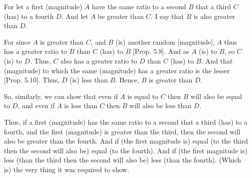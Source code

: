 \begin{Parallel}{}{}
{\epsfysize=0.5in
\centerline{}

For let a first (magnitude) $A$ have the same ratio to a second $B$  that a
third $C$ (has) to a fourth $D$. And let $A$ be greater than $C$. I say that $B$
is also greater than $D$.

For since $A$ is greater than $C$, and $B$ (is) another random [magnitude],
$A$ thus has a greater ratio to $B$ than $C$ (has) to $B$ [Prop. 5.8]. And as $A$ (is) to $B$, so $C$ (is) to
$D$. Thus, $C$ also has a greater ratio to $D$ than $C$ (has) to $B$. And that (magnitude) to
which the same (magnitude) has a greater ratio is the lesser
 [Prop. 5.10]. Thus, $D$
(is) less than $B$. Hence, $B$ is greater than $D$.

So, similarly, we can show that even if $A$ is equal to $C$ then $B$ will also be equal to $D$, and even if $A$ is less than $C$ then $B$ will also be less than $D$.

Thus, if a first (magnitude) has the same ratio to a second  that a third (has) to a fourth, and the first (magnitude) is greater than the third,
then the second will also be greater than the fourth. And if (the first magnitude is) equal
(to the third then the second will also be) equal (to the fourth). And
if (the first magnitude  is) less (than the third then the second will also be) less (than the fourth). (Which is) the very thing it was required to show.}
\end{Parallel}


\vspace{7pt}{\footnotesize \noindent$^\dag$ In modern notation, this proposition
reads that if $\alpha:\beta::\gamma:\delta$ then $\alpha \gtreqqless \gamma$ as
$\beta\gtreqqless\delta$.}

